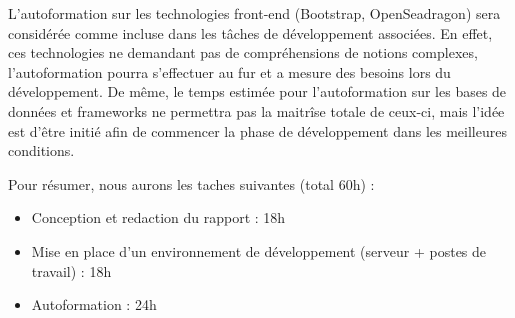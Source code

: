     L'autoformation sur les technologies front-end (Bootstrap, OpenSeadragon) sera considérée comme incluse dans les tâches de développement associées. En effet, ces technologies ne demandant pas de compréhensions de notions complexes, l'autoformation pourra s'effectuer au fur et a mesure des besoins lors du développement.
    De même, le temps estimée pour l'autoformation sur les bases de données et frameworks ne permettra pas la maitrîse totale de ceux-ci, mais l'idée est d'être initié afin de commencer la phase de développement dans les meilleures conditions.

Pour résumer, nous aurons les taches suivantes (total 60h) :
\begin{itemize}
\item Conception et redaction du rapport : 18h
\item Mise en place d'un environnement de développement (serveur + postes de travail) : 18h
\item Autoformation : 24h
\end{itemize}

